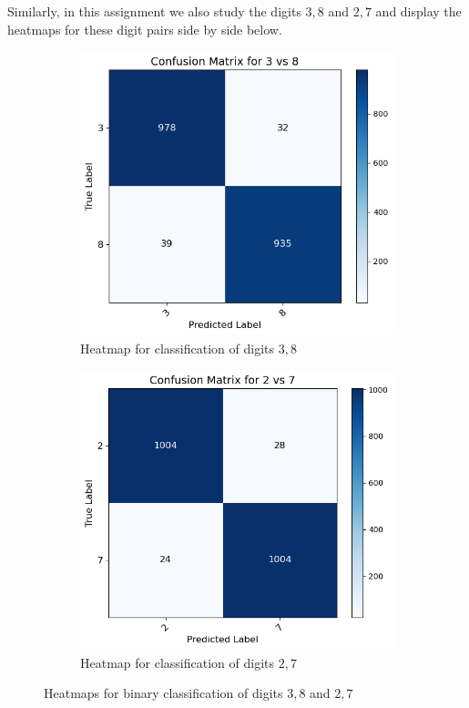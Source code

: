 \documentclass[11pt]{amsart}
\begin{document}
Similarly, in this assignment we also study the digits $3, 8$ and $2, 7$ and display the heatmaps for these digit pairs side by side below.

\begin{figure}[htbp]
    \centering
    \begin{subfigure}[b]{0.45\textwidth}
        \centering
        \includegraphics[width=\textwidth]{Confusion3v8.png}
        \caption{Heatmap for classification of digits $3, 8$}
        \label{fig:subfig1}
    \end{subfigure}
    \hfill
    \begin{subfigure}[b]{0.45\textwidth}
        \centering
        \includegraphics[width=\textwidth]{Confusion2v7.png}
        \caption{Heatmap for classification of digits $2, 7$}
        \label{fig:subfig2}
    \end{subfigure}
    
    \caption{Heatmaps for binary classification of digits $3, 8$ and $2, 7$}
    \label{fig:side-by-side}
\end{figure}
\end{document}
